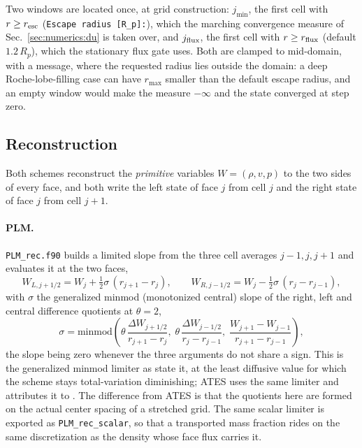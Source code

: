 Two windows are located once, at grid construction: $j_{\min}$, the first
cell with $r \ge r_{\rm esc}$ (\texttt{Escape radius [R\_p]:}), which the
marching convergence measure of Sec.~\ref{sec:numerics:du} is taken over, and
$j_{\rm flux}$, the first cell with $r \ge r_{\rm flux}$ (default
$1.2\,R_p$), which the stationary flux gate uses.  Both are clamped to
mid-domain, with a message, where the requested radius lies outside the
domain: a deep Roche-lobe-filling case can have $r_{\max}$ smaller than the
default escape radius, and an empty window would make the measure $-\infty$
and the state converged at step zero.

\subsection{Reconstruction}
\label{sec:numerics:reconstruction}

Both schemes reconstruct the \emph{primitive} variables $W = (\rho, v, p)$ to
the two sides of every face, and both write the left state of face $j$ from
cell $j$ and the right state of face $j$ from cell $j+1$.

\paragraph{PLM.}
\texttt{PLM\_rec.f90} builds a limited slope from the three cell averages
$j-1, j, j+1$ and evaluates it at the two faces,
%
\begin{equation}
  W_{L,j+1/2} = W_j + \tfrac12\sigma\,(r_{j+1}-r_j),
  \qquad
  W_{R,j-1/2} = W_j - \tfrac12\sigma\,(r_j-r_{j-1}),
  \label{eq:plm}
\end{equation}
%
with $\sigma$ the generalized minmod (monotonized central) slope of the right,
left and central difference quotients at $\theta = 2$,
%
\begin{equation}
  \sigma = \mathrm{minmod}\!\left(
     \theta\,\frac{\Delta W_{j+1/2}}{r_{j+1}-r_j},\;
     \theta\,\frac{\Delta W_{j-1/2}}{r_j-r_{j-1}},\;
     \frac{W_{j+1}-W_{j-1}}{r_{j+1}-r_{j-1}}\right),
  \label{eq:minmod}
\end{equation}
%
the slope being zero whenever the three arguments do not share a sign.  This
is the generalized minmod limiter as \citet{Kaeppeli2016} state it, at the
least diffusive value for which the scheme stays total-variation diminishing;
ATES uses the same limiter and attributes it to \citet{Kurganov2000}.  The
difference from ATES is that the quotients here are formed on the actual
center spacing of a stretched grid.  The same scalar limiter is exported as
\texttt{PLM\_rec\_scalar}, so that a transported mass fraction rides on the
same discretization as the density whose face flux carries it.

